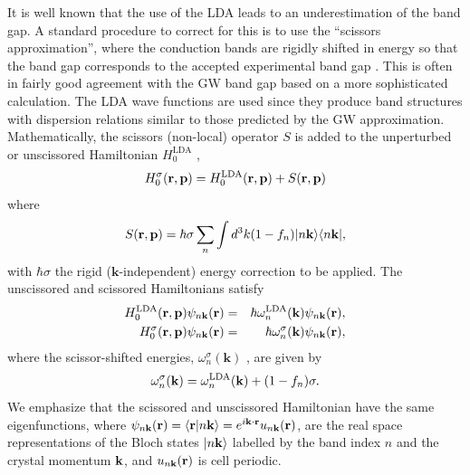 \documentclass[floatfix,prb,aps,superscriptaddress,11pt,preprint,letterpaper]{revtex4}
\def\chon{black}
\begin{document}
{\color{\chon} It} is well known that the use of the {\color{\chon} LDA} 
leads to an underestimation of the band gap. A standard
procedure to correct for this is to
use {\color{\chon} the} ``scissors approximation'', {\color{\chon} where the 
conduction bands are rigidly shifted in energy} so that the band gap 
corresponds to the accepted experimental band gap{\color{\chon} .
This} is often in fairly good agreement with the GW
band gap based on a more sophisticated calculation.\cite{hybertsenPRB86}
{\color{\chon} T}he LDA wave functions are used since they produce band
structures with dispersion relations similar to those predicted by the GW
approximation. Mathematically, {\color{\chon} the scissors (non-local) operator 
$S$ is added} to the unperturbed or unscissored Hamiltonian {\color{\chon} $H^{\mathrm{LDA}}_{0}$ ,}
\begin{equation*}
H^\sigma_{0}(\mathbf{r},\mathbf{p})=H^{\mathrm{LDA}}_{0}(\mathbf{r},\mathbf{p})+S(\mathbf{r},\mathbf{p})
\end{equation*}
where 
\begin{equation}
S(\mathbf{r},\mathbf{p})=\hbar \sigma\sum_{n}\int d^{3}k(1-f_{n})
|n\mathbf{k}\rangle\langle n\mathbf{k}|,
\label{hats}
\end{equation}
with $\hbar \sigma$  the rigid ($\mathbf{k}$-independent) energy correction to be
applied. 
The unscissored and scissored Hamiltonians satisfy 
\begin{eqnarray*}
H^{\mathrm{LDA}}_{0}(\mathbf{r},\mathbf{p})\psi _{n\mathbf{k}}(\mathbf{r}) &=&\hbar \omega^{\mathrm{LDA}}_{n}(\mathbf{k})\psi _{n\mathbf{k}}(\mathbf{r}),
\label{hamils} \\
H_{0}^\sigma (\mathbf{r},\mathbf{p})\psi _{n\mathbf{k}}(\mathbf{r}) &=&\hbar \omega_{n}^\sigma
(\mathbf{k})\psi _{n\mathbf{k}}(\mathbf{r}),
\end{eqnarray*}
where the scissor-shifted energies, 
$\omega_{n}^\sigma(\mathbf{k})$ , are given by
\begin{equation}
\omega_{n}^\sigma(\mathbf{k})=\omega^{\mathrm{LDA}}_{n}(\mathbf{k})+(1-f_{n})\sigma.
\label{wese}
\end{equation}
We emphasize that the {\color{\chon} scissored and unscissored Hamiltonian 
have the same eigenfunctions,} where
$\psi_{n\mathbf{k}}(\mathbf{r})=\langle {\mathbf{r}} | {n\mathbf{k}} \rangle=e^{i\mathbf{k}\cdot\mathbf{r}}u_{n\mathbf{k}}(\mathbf{r})$,
are the real space representations of the Bloch states $| n\mathbf{k} \rangle$ labelled 
by the band index $n$ and the crystal momentum $\mathbf{k}$, and $u_{n\mathbf{k}}(\mathbf{r})$
is cell periodic. 
\end{document}
